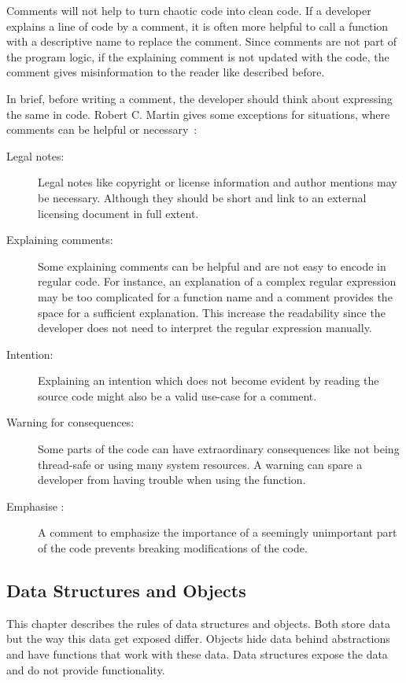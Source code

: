 Comments will not help to turn chaotic code into clean code. If a developer explains a line of code by a comment, it is often more helpful to call a function with a descriptive name to replace the comment. Since comments are not part of the program logic, if the explaining comment is not updated with the code, the comment gives misinformation to the reader like described before.

In brief, before writing a comment, the developer should think about expressing the same in code. Robert C. Martin gives some exceptions for situations, where comments can be helpful or necessary~\cite{martin_clean_2009}:

\begin{description}
    \item[Legal notes:] Legal notes like copyright or license information and author mentions may be necessary. Although they should be short and link to an external licensing document in full extent.
    \item[Explaining comments:] Some explaining comments can be helpful and are not easy to encode in regular code. For instance, an explanation of a complex regular expression may be too complicated for a function name and a comment provides the space for a sufficient explanation. This increase the readability since the developer does not need to interpret the regular expression manually.
    \item[Intention:] Explaining an intention which does not become evident by reading the source code might also be a valid use-case for a comment. 
    \item[Warning for consequences:] Some parts of the code can have extraordinary consequences like not being thread-safe or using many system resources. A warning can spare a developer from having trouble when using the function.
    \item[Emphasise :] A comment to emphasize the importance of a seemingly unimportant part of the code prevents breaking modifications of the code. 
\end{description}

\subsection{Data Structures and Objects}
This chapter describes the rules of data structures and objects. Both store data but the way this data get exposed differ. Objects hide data behind abstractions and have functions that work with these data. Data structures expose the data and do not provide functionality. 

